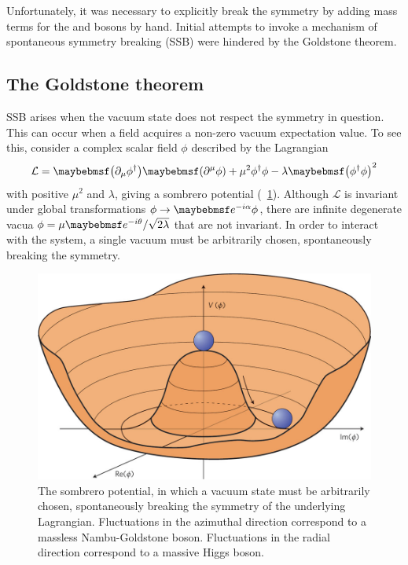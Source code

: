 Unfortunately, it was necessary to explicitly break the symmetry by adding mass terms for 
the \PWpm and \PZ bosons by hand. Initial attempts to invoke a mechanism of spontaneous 
symmetry breaking (SSB) were hindered by the Goldstone theorem.



\subsection{The Goldstone theorem}
\label{sec:ewsb:goldstone}
SSB arises when the vacuum state does not respect the symmetry in question. This can 
occur when a field acquires a non-zero vacuum expectation value. To see this, consider a 
complex scalar field $\phi$ described by the Lagrangian
\begin{equation}
	\mathcal{L} 
	= \parenths{\partial_{\mu}\phi^{\dagger}} \parenths{\partial^{\mu}\phi} 
	+ \mu^2 \phi^{\dagger}\phi - \lambda \parenths{\phi^{\dagger}\phi}^2
	\label{eq:lagr:goldstone}
\end{equation}
with positive $\mu^2$ and $\lambda$, giving a sombrero potential 
(\Figure~\ref{fig:sombrero}). 
Although $\mathcal{L}$ is invariant under global  transformations 
$\phi \rightarrow \eexp{-i\alpha} \phi$, there are infinite degenerate vacua
$\phi = \mu\eexp{-i\theta}/\sqrt{2\lambda}$ that are not invariant. In order to interact 
with the system, a single vacuum must be arbitrarily chosen, spontaneously breaking the 
 symmetry.

\begin{figure}[t]
	\includegraphics[width=\mediumfigwidth]{tex/motivation/sombrero}
	\caption{The sombrero potential, in which a vacuum state must be arbitrarily chosen, 
	spontaneously breaking the symmetry of the underlying Lagrangian.
	Fluctuations in the azimuthal direction correspond to a massless Nambu-Goldstone 
	boson. Fluctuations in the radial direction correspond to a massive Higgs boson.}
	\label{fig:sombrero}
\end{figure}

